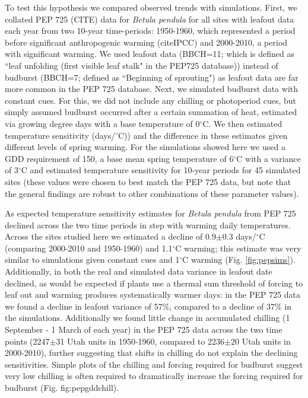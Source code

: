 \documentclass{article}
\begin{document}
\par To test this hypothesis we compared observed trends with simulations. First, we collated PEP 725 (CITE) data for \emph{Betula pendula} for all sites with leafout data each year from two 10-year time-periods: 1950-1960, which represented a period before significant anthropogenic warming (citeIPCC) and 2000-2010, a period with significant warming. We used leafout data (BBCH=11; which is defined as ``leaf unfolding (first visible leaf stalk" in the PEP725 database)) instead of budburst (BBCH=7; defined as ``Beginning of sprouting") as leafout data are far more common in the PEP 725 database. %
Next, we simulated budburst data with constant cues. For this, we did not include any chilling or photoperiod cues, but simply assumed budburst occurred after a certain summation of heat, estimated via growing degree days with a base temperature of 0$^{\circ}$C. We then estimated temperature sensitivity (days/$^{\circ}$C)) and the difference in these estimates given different levels of spring warming. For the simulations showed here we used a GDD requirement of 150, a base mean spring temperature of 6$^{\circ}$C with a variance of 3$^{\circ}$C and estimated temperature sensitivity for 10-year periods for 45 simulated sites (these values were chosen to best match the PEP 725 data, but note that the general findings are robust to other combinations of these parameter values).

\par As expected temperature sensitivity estimates for \emph{Betula pendula} from PEP 725 declined across the two time periods in step with warming daily temperatures. Across the sites studied here we estimated a decline of 0.9$\pm$0.3 days/$^{\circ}$C (comparing 2000-2010 and 1950-1960) and 1.1$^{\circ}$C warming; this estimate was very similar to simulations given constant cues and 1$^{\circ}$C warming (Fig. \ref{fig:pepsims}). Additionally, in both the real and simulated data variance in leafout date declined, as would be expected if plants use a thermal sum threshold of forcing to leaf out and warming produces systematically warmer days: in the PEP 725 data we found a decline in leafout variance of 57\%, compared to a decline of 37\% in the simulations. Additionally we found little change in accumulated chilling (1 September - 1 March of each year) in the PEP 725 data across the two time points (2247$\pm$31 Utah units in 1950-1960, compared to 2236$\pm$20 Utah units in 2000-2010), further suggesting that shifts in chilling do not explain the declining sensitivities. Simple plots of the chilling and forcing required for budburst suggest very low chilling is often required to dramatically increase the forcing required for budburst (Fig. {fig:pepgddchill}).
\end{document}
